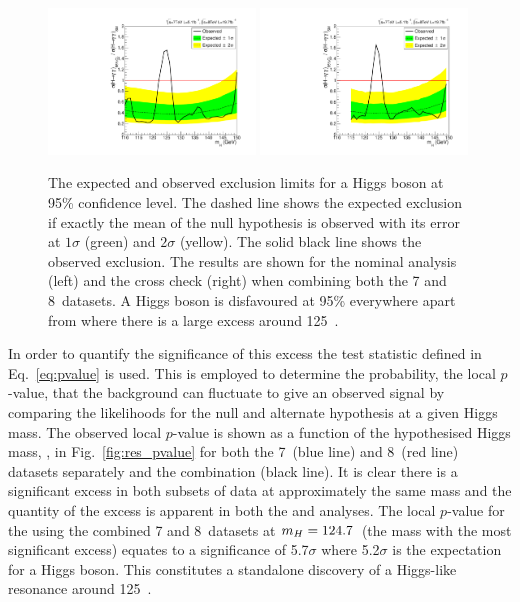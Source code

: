 \begin{figure}
  \includegraphics[width=0.49\textwidth]{results/plots/mva_limit.pdf}
  \includegraphics[width=0.49\textwidth]{results/plots/sideband_limit.pdf}
  \caption[The expected and observed exclusion limits for a \acs{SM} Higgs boson at 95\& confidence level]{The expected and observed exclusion limits for a \SM Higgs boson at 95\% confidence level. The dashed line shows the expected exclusion if exactly the mean of the null hypothesis is observed with its error at $1\sigma$ (green) and $2\sigma$ (yellow). The solid black line shows the observed exclusion. The results are shown for the nominal \MFM analysis (left) and the cross check \SMVA (right) when combining both the 7 and 8~\TeV datasets. A \SM Higgs boson is disfavoured at 95\% everywhere apart from where there is a large excess around 125~\GeV.}
  \label{fig:res_exclusion}
\end{figure}

In order to quantify the significance of this excess the test statistic defined in Eq.~\ref{eq:pvalue} is used. This is employed to determine the probability, the local $p$-value, that the background can fluctuate to give an observed signal by comparing the likelihoods for the null and alternate hypothesis at a given Higgs mass. The observed local $p$-value is shown as a function of the hypothesised Higgs mass, \mH, in Fig.~\ref{fig:res_pvalue} for both the 7~\TeV (blue line) and 8~\TeV (red line) datasets separately and the combination (black line). It is clear there is a significant excess in both subsets of data at approximately the same mass and the quantity of the excess is apparent in both the \MFM and \SMVA analyses. The local $p$-value for the \MFM using the combined 7 and 8~\TeV datasets at $m_{H}=124.7$~\GeV (the mass with the most significant excess) equates to a significance of 5.7$\sigma$ where 5.2$\sigma$ is the expectation for a \SM Higgs boson. This constitutes a standalone discovery of a Higgs-like resonance around 125~\GeV.

